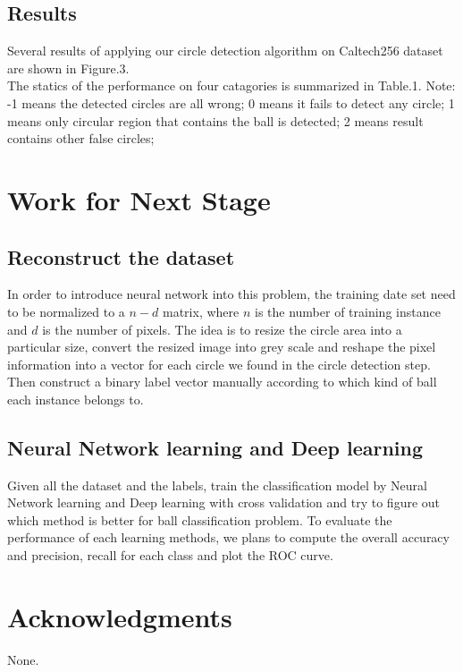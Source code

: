 \documentclass{article}
\begin{document}
\subsection{Results}
 
Several results of applying our circle detection algorithm on Caltech256 dataset are shown in Figure.3.\\
The statics of the performance on four catagories is summarized in Table.1. Note: -1 means the detected circles are all wrong; 0 means it fails to detect any circle; 1 means only circular region that contains the ball is detected; 2 means result contains other false circles; 

\section{Work for Next Stage} 

\subsection{Reconstruct the dataset}
In order to introduce neural network into this problem, the training date set need to be normalized to a $n-d$ matrix, where $n$ is the number of training instance and $d$ is the number of pixels. The idea is to resize the circle area into a particular size, convert the resized image into grey scale and reshape the pixel information into a vector for each circle we found in the circle detection step. Then construct a binary label vector manually according to which kind of ball each instance belongs to.
\subsection{Neural Network learning and Deep learning}
Given all the dataset and the labels, train the classification model by Neural Network learning and Deep learning with cross validation and try to figure out which method is better for ball classification problem. To evaluate the performance of each learning methods, we plans to compute the overall accuracy and precision, recall for each class and plot the ROC curve.\\

\section*{Acknowledgments} 
  None.



\end{document}
